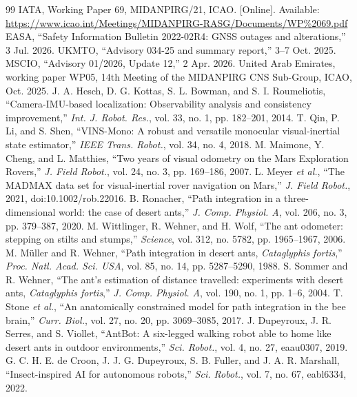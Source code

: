 \begin{thebibliography}{99}
 IATA, Working Paper 69, MIDANPIRG/21, ICAO. [Online]. Available: \url{https://www.icao.int/Meetings/MIDANPIRG-RASG/Documents/WP\%2069.pdf}
 EASA, ``Safety Information Bulletin 2022-02R4: GNSS outages and alterations,'' 3 Jul. 2026.
 UKMTO, ``Advisory 034-25 and summary report,'' 3--7 Oct. 2025.
 MSCIO, ``Advisory 01/2026, Update 12,'' 2 Apr. 2026.
 United Arab Emirates, working paper WP05, 14th Meeting of the MIDANPIRG CNS Sub-Group, ICAO, Oct. 2025.
 J. A. Hesch, D. G. Kottas, S. L. Bowman, and S. I. Roumeliotis, ``Camera-IMU-based localization: Observability analysis and consistency improvement,'' \emph{Int. J. Robot. Res.}, vol. 33, no. 1, pp. 182--201, 2014.
 T. Qin, P. Li, and S. Shen, ``VINS-Mono: A robust and versatile monocular visual-inertial state estimator,'' \emph{IEEE Trans. Robot.}, vol. 34, no. 4, 2018.
 M. Maimone, Y. Cheng, and L. Matthies, ``Two years of visual odometry on the Mars Exploration Rovers,'' \emph{J. Field Robot.}, vol. 24, no. 3, pp. 169--186, 2007.
 L. Meyer \emph{et al.}, ``The MADMAX data set for visual-inertial rover navigation on Mars,'' \emph{J. Field Robot.}, 2021, doi:10.1002/rob.22016.
 B. Ronacher, ``Path integration in a three-dimensional world: the case of desert ants,'' \emph{J. Comp. Physiol. A}, vol. 206, no. 3, pp. 379--387, 2020.
 M. Wittlinger, R. Wehner, and H. Wolf, ``The ant odometer: stepping on stilts and stumps,'' \emph{Science}, vol. 312, no. 5782, pp. 1965--1967, 2006.
 M. M\"uller and R. Wehner, ``Path integration in desert ants, \emph{Cataglyphis fortis},'' \emph{Proc. Natl. Acad. Sci. USA}, vol. 85, no. 14, pp. 5287--5290, 1988.
 S. Sommer and R. Wehner, ``The ant's estimation of distance travelled: experiments with desert ants, \emph{Cataglyphis fortis},'' \emph{J. Comp. Physiol. A}, vol. 190, no. 1, pp. 1--6, 2004.
 T. Stone \emph{et al.}, ``An anatomically constrained model for path integration in the bee brain,'' \emph{Curr. Biol.}, vol. 27, no. 20, pp. 3069--3085, 2017.
 J. Dupeyroux, J. R. Serres, and S. Viollet, ``AntBot: A six-legged walking robot able to home like desert ants in outdoor environments,'' \emph{Sci. Robot.}, vol. 4, no. 27, eaau0307, 2019.
 G. C. H. E. de Croon, J. J. G. Dupeyroux, S. B. Fuller, and J. A. R. Marshall, ``Insect-inspired AI for autonomous robots,'' \emph{Sci. Robot.}, vol. 7, no. 67, eabl6334, 2022.

\end{thebibliography}
